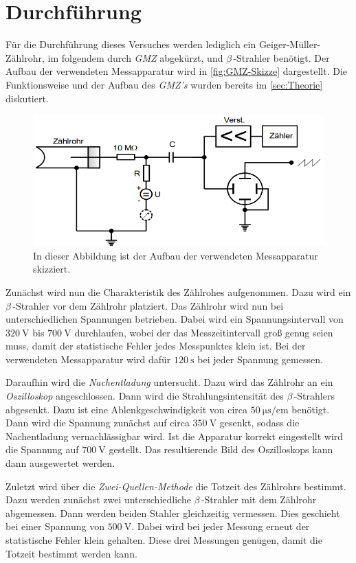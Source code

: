 \section{Durchführung}
\label{sec:Durchführung}
Für die Durchführung dieses Versuches werden lediglich ein Geiger-Müller-Zählrohr, im folgendem durch \textit{GMZ} abgekürzt, und $\beta$\,-Strahler benötigt. Der Aufbau der
verwendeten Messapparatur wird in \autoref{fig:GMZ-Skizze} dargestellt. Die Funktionsweise und der Aufbau des \textit{GMZ's} wurden bereits im \autoref{sec:Theorie} diskutiert.

\begin{figure}
    \centering
    \includegraphics[width = .8\textwidth]{content/Messapparatur.PNG}
    \caption{In dieser Abbildung ist der Aufbau der verwendeten Messapparatur skizziert. \cite{v703}}
    \label{fig:GMZ-Skizze}
\end{figure}

Zunächst wird nun die Charakteristik des Zählrohes aufgenommen. Dazu wird ein $\beta$\,-Strahler vor dem Zählrohr platziert. Das Zählrohr wird nun bei unterschiedlichen
Spannungen betrieben. Dabei wird ein Spannungsintervall von $\qty{320}{\volt}$ bis $\qty{700}{\volt}$ durchlaufen, wobei der das Messzeitintervall groß genug seien muss, damit
der statistische Fehler jedes Messpunktes klein ist. Bei der verwendeten Messapparatur wird dafür $\qty{120}{\second}$ bei jeder Spannung gemessen. 

Daraufhin wird die \textit{Nachentladung} untersucht. Dazu wird das Zählrohr an ein \textit{Oszilloskop} angeschlossen. Dann wird die Strahlungsintensität des 
$\beta$\,-Strahlers abgesenkt. Dazu ist eine Ablenkgeschwindigkeit von circa $\qty{50}{\micro\second\per\centi\metre}$ benötigt. Dann wird die Spannung zunächst auf circa
$\qty{350}{\volt}$ gesenkt, sodass die Nachentladung vernachlässigbar wird. Ist die Apparatur korrekt eingestellt wird die Spannung auf $\qty{700}{\volt}$ gestellt. Das 
resultierende Bild des Oszilloskops kann dann ausgewertet werden. 

Zuletzt wird über die \textit{Zwei-Quellen-Methode} die Totzeit des Zählrohrs bestimmt. Dazu werden zunächst zwei unterschiedliche $\beta$\,-Strahler mit dem Zählrohr 
abgemessen. Dann werden beiden Stahler gleichzeitig vermessen. Dies geschieht bei einer Spannung von $\qty{500}{\volt}$. Dabei wird bei jeder Messung erneut der statistische
Fehler klein gehalten. Diese drei Messungen genügen, damit die Totzeit bestimmt werden kann. 